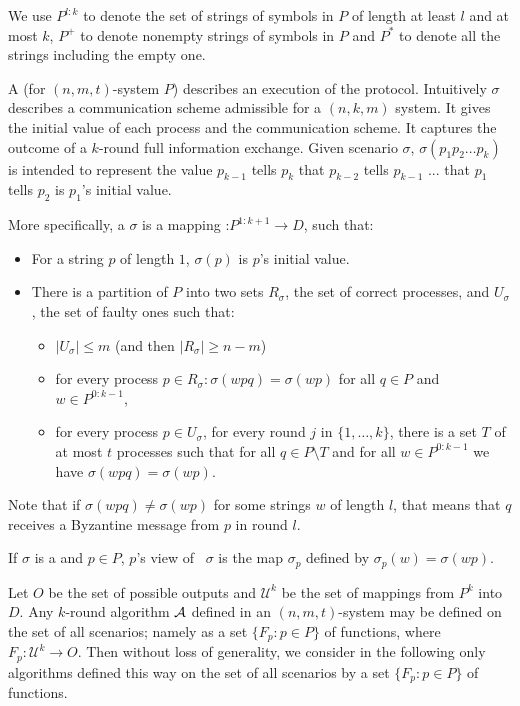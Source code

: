 {{We use $P^{l:k}$ to denote the set of strings of symbols in $P$ of length at least $l$ 
and at most $k$, $P^{+}$ to denote nonempty strings of symbols in $P$
and $P^{*}$ to denote all the strings including the empty one.

 A {} (for $(n,m,t)$-system $P$) describes an
 execution of the protocol. Intuitively  $\sigma$ describes a 
 communication scheme admissible for a $(n,k,m)$ system.
 It gives the initial value of each process and the communication scheme.
It captures the outcome of a $k$-round full information exchange.
Given scenario $\sigma$, 
$\sigma ( p_{1}
p_{2} \ldots p_{k} )$ is intended to represent the value $p_{k-1}$
tells $p_k$ that $p_{k-2}$ tells $p_{k-1}$ ... that $p_1$ tells $p_2$
is $p_1$'s initial value. 

 More specifically,  a  {} $\sigma$
  is a mapping :$P^{1:k+1}
\rightarrow D$, such that:
\begin{itemize}
\item
For a string $p$ of length $1$, $\sigma(p)$ is $p$'s initial value. 
\item
There is a partition of $P$ into two sets $R_{\sigma} $, the set of
correct processes,  and $U_\sigma$, the set of faulty ones
such that:
\begin{itemize}
\item
$|U_\sigma| \leq m$ (and then $|R_\sigma|\geq n-m$)
\item
for every  process $p\in R_{\sigma} : \sigma(w p q) = \sigma(w p)$ for all
$q\in P$ and $w\in P^{0:k-1}$,  
\item
for every process $p\in U_\sigma$,  for every round $j$ in $\{1,\ldots
, k\}$,  there is a set $T$ of at most $t$ processes such that for
all $q\in P\setminus T$  and for all
$w\in P^{0:k-1}$ we have $\sigma(w p q) = \sigma(w p)$.
\end{itemize}
\end{itemize}
Note that if  $\sigma(wpq) \neq \sigma(wp)$ for some strings $w$ of
length $l$, that means that $q$  receives a Byzantine message from $p$
in round $l$.



If $\sigma$ is a
{} and $p \in P$, $p$'s view of \ $\sigma$ is
the map $\sigma_p$ defined by 
$\sigma_{p} ( w ) = \sigma ( w p )$. 


Let $O$ be the set of possible outputs and $\mathcal{U}^{k}$ be the
set of mappings from $P^{k}$ into $D$.
Any $k$-round algorithm $\cal A$ defined in an $(n,m,t)$-system
may be defined  on the set of all scenarios; namely as a set $\{ F_{p}
: p \in P \}$ of functions, 
where $F_{p} : \mathcal{U}^{k}  \rightarrow O$. 
Then without loss of generality, we consider in the following only algorithms
defined this way on the set of all scenarios by a set $\{ F_{p}
: p \in P \}$ of functions.

}}
